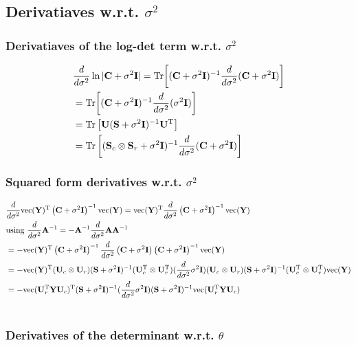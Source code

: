 \documentclass{article}
\newcommand{\B}[1]{{\bf{#1}}}
\begin{document}
\subsection{Derivatiaves w.r.t. $\sigma^2$}
\subsubsection{Derivatiaves of the log-det term w.r.t. $\sigma^2$}

\begin{align}&
\ds \ln | \B{C} + \sigma^2\B{I} |  = \Tr{\left[ (\B{C} +
  \sigma^2\B{I})^{-1} \ds (\B{C} + \sigma^2 \B{I})\right]} \\&
 =  \Tr{\left[ (\B{C} + \sigma^2\B{I})^{-1} \ds (\sigma^2 \B{I})\right]} \\&
   = \Tr \left [ \B{U} (\B{S} + \sigma^2\B{I})^{-1}\B{U}^{\T} \right ] \\&
  =  \Tr \left [ (\B{S}_c \otimes \B{S}_r + \sigma^2\B{I})^{-1} \ds (\B{C} + \sigma^2 \B{I})\right]
\end{align}
\subsubsection{Squared form derivatives w.r.t. $\sigma^2$}

\begin{align}&
\ds \col(\B{Y})^{\T} \BS^{-1}\col(\B{Y})  = \col(\B{Y})^{\T} \ds
\BS^{-1} \col(\B{Y})  \\&
 \text{using $\ds \bfA^{-1} = -\bfA^{-1} \ds \bfA \bfA^{-1}$}\\&
  =-\col(\B{Y})^{\T} \BS^{-1} \ds \BS \BS^{-1} \col(\B{Y}) \\&
  = -\col({\bfY})^{\T} (\B{U}_c \otimes \B{U}_r) (\B{S} + \sigma^{2}
\B{I})^{-1} (\B{U}_c^{\T} \otimes \B{U}_r^{\T}) (\ds \sigma^2\B{I})
(\B{U}_c \otimes \B{U}_r) (\B{S} + \sigma^{2} \B{I})^{-1} (\B{U}_c^{\T}
\otimes \B{U}_r^{\T}) \col({\bfY}) \\&
  = -\col (\B{U}_r^{\T} \bfY \B{U}_c)^{\T} (\B{S} + \sigma^{2}\B{I})^{-1} (\ds \sigma^2\B{I}) (\B{S} + \sigma^{2}\B{I})^{-1} \col (\B{U}_r^{\T} \bfY \B{U}_c) \\&
\end{align}

\subsubsection{Derivatives of the determinant w.r.t. $\theta$}
\end{document}
